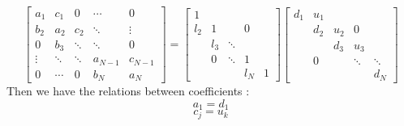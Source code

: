 \documentclass{article}
\begin{document}
                    \begin{equation}
                        \label{eq:laaslu}
                        \begin{bmatrix}
                            a_{1}  & c_{1}  & 0      & \cdots & 0 \\
                            b_{2}  & a_{2}  & c_{2}  & \ddots & \vdots \\
                            0      & b_{3}  & \ddots & \ddots & 0 \\
                            \vdots & \ddots & \ddots & a_{N-1}& c_{N-1}\\
                            0      & \cdots & 0      & b_{N}  & a_{N}
                        \end{bmatrix}
                        =
                        \begin{bmatrix}
                            1      &        &        &        &  \\
                             l_{2} & 1      &        &   0    &  \\
                                   &  l_{3} & \ddots &        & \\
                                   & 0      & \ddots & 1      & \\
                                   &        &        & l_{N}  & 1
                        \end{bmatrix}
                        \begin{bmatrix}
                            d_{1}  &  u_{1} &        &        &  \\
                                   & d_{2}  & u_{2}  &  0     &  \\
                                   &        & d_{3}  & u_{3} & \\
                                   & 0      &        & \ddots  & \ddots\\
                                   &        &        &        & d_{N}
                        \end{bmatrix}
                    \end{equation}
                    Then we have the relations between coefficients :
                    \begin{equation}
                        a_{1} = d_{1}
                    \end{equation}
                    \begin{equation}
                        \label{eq:cu}
                        c_{j} = u_{k}
                    \end{equation}
\end{document}
